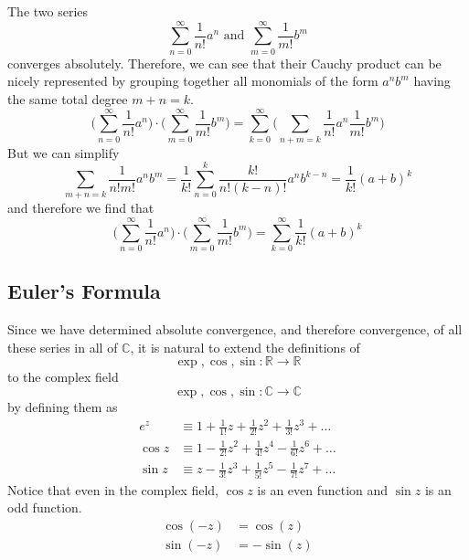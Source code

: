     \begin{example}
    The two series 
    \[\sum_{n = 0}^\infty \frac{1}{n!} a^n \text{ and } \sum_{m = 0}^\infty \frac{1}{m!} b^m\]
    converges absolutely. Therefore, we can see that their Cauchy product can be nicely represented by grouping together all monomials of the form $a^n b^m$ having the same total degree $m + n = k$. 
    \[\bigg( \sum_{n = 0}^\infty \frac{1}{n!} a^n \bigg) \cdot \bigg( \sum_{m = 0}^\infty \frac{1}{m!} b^m \bigg) = \sum_{k=0}^\infty \bigg(\sum_{n+m=k} \frac{1}{n!} a^n \frac{1}{m!} b^m \bigg)\]
    But we can simplify 
    \[\sum_{m + n = k} \frac{1}{n! m!} a^n b^m = \frac{1}{k!} \sum_{n=0}^k \frac{k!}{n! (k-n)!} a^n b^{k-n} = \frac{1}{k!} (a + b)^k\]
    and therefore we find that 
    \[\bigg( \sum_{n = 0}^\infty \frac{1}{n!} a^n \bigg) \cdot \bigg( \sum_{m = 0}^\infty \frac{1}{m!} b^m \bigg) = \sum_{k=0}^\infty \frac{1}{k!} (a + b)^k\]
  \end{example}

    \subsection{Euler's Formula}

    \begin{definition}
      Since we have determined absolute convergence, and therefore convergence, of all these series in all of $\mathbb{C}$, it is natural to extend the definitions of 
      \[\exp, \cos, \sin: \mathbb{R} \longrightarrow \mathbb{R}\]
      to the complex field 
      \[\exp, \cos, \sin: \mathbb{C} \longrightarrow \mathbb{C}\]
      by defining them as 
      \begin{align*}
          e^z & \equiv 1 + \frac{1}{1!}z + \frac{1}{2!} z^2 + \frac{1}{3!} z^3 + \ldots \\
          \cos{z} & \equiv 1 - \frac{1}{2!} z^2 + \frac{1}{4!} z^4 - \frac{1}{6!} z^6 + \ldots \\
          \sin{z} & \equiv z - \frac{1}{3!} z^3 + \frac{1}{5!} z^5 - \frac{1}{7!} z^7 + \ldots
      \end{align*}
      Notice that even in the complex field, $\cos{z}$ is an even function and $\sin{z}$ is an odd function. 
      \begin{align*}
          \cos(-z) & = \cos(z) \\
          \sin(-z) & = -\sin(z)
      \end{align*}
    \end{definition}

